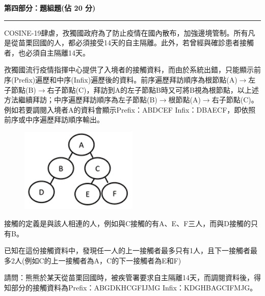 \documentclass[a4paper, 12pt, addpoints]{exam}
\begin{document}
\newpage
\noindent \textbf{\large 第四部分：題組題(佔 20 分)}
\vspace{0.15in}
\hrule
\vspace{0.1in}
\begin{questions}
    \question[12] COSINE-19肆虐，孜獨國政府為了防止疫情在國內散布，加強邊境管制。所有凡是從苗栗回國的人，都必須接受14天的自主隔離。此外，若曾經與確診患者接觸者，也必須自主隔離14天。

    孜獨國流行疫情指揮中心提供了入境者的接觸資料，而由於系統出錯，只能顯示前序(Prefix)遍歷和中序(Infix)遍歷後的資料。前序遍歷拜訪順序為根節點(A)$\rightarrow$左子節點(B)$\rightarrow$右子節點(C)，拜訪到A的左子節點B時又可將B視為根節點，以上述方法繼續拜訪；中序遍歷拜訪順序為左子節點(B)$\rightarrow$根節點(A)$\rightarrow$右子節點(C)。例如若要調閱入境者A的資料會顯示Prefix：ABDCEF  Infix：DBAECF，即依照前序或中序遍歷拜訪順序輸出。

    \begin{figure}[H]
        \centerline{\includegraphics[width=0.5\textwidth]{fig/covid.png}}
    \end{figure}


    接觸的定義是與該人相連的人，例如與C接觸的有A、E、F三人，而與D接觸的只有B。

    已知在這份接觸資料中，發現任一人的上一接觸者最多只有1人，且下一接觸者最多2人(例如C的上一接觸者為A，C的下一接觸者為E和F)

    請問：熊熊於某天從苗栗回國時，被疾管署要求自主隔離14天，而調閱資料後，得知部分的接觸資料為Prefix：ABGDKHCGFIJMG  Infix：KDGHBAGCIFMJG。



\end{questions}
\end{document}

